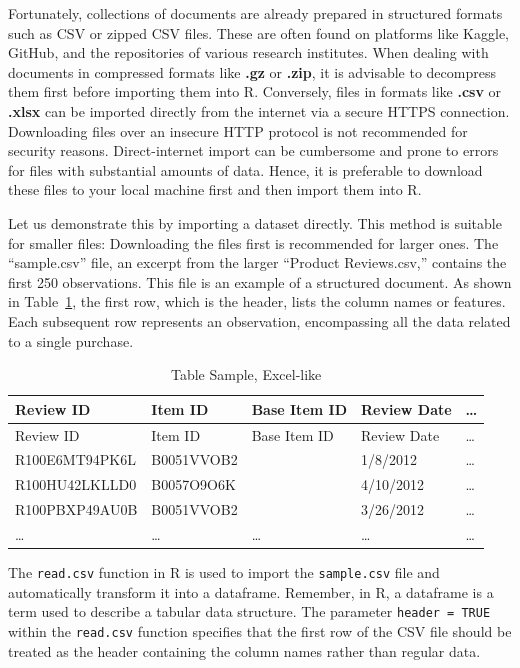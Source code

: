 Fortunately, collections of documents are already prepared in structured
formats such as CSV or zipped CSV files. These are often found on platforms
like Kaggle, GitHub, and the repositories of various research institutes. When
dealing with documents in compressed formats like \textbf{.gz} or
\textbf{.zip}, it is advisable to decompress them first before importing
them into R. Conversely, files in formats like \textbf{.csv} or
\textbf{.xlsx} can be imported directly from the internet via a secure
HTTPS connection. Downloading files over an insecure HTTP protocol is
not recommended for security reasons. Direct-internet import can be
cumbersome and prone to errors for files with substantial amounts of data. Hence,
it is preferable to download these files to your local machine first and
then import them into R.

Let us demonstrate this by  importing a dataset directly. This method is suitable for smaller files: Downloading the files first 
is recommended for larger ones. The ``sample.csv'' file, an excerpt from
the larger ``Product Reviews.csv,'' contains the first 250 observations.
This file is an example of a structured document. As shown in
Table~\ref{tbl-csvtable}, the first row, which is the header, lists the
column names or features. Each subsequent row represents an observation,
encompassing all the data related to a single purchase.

\begin{longtable}[]{@{}lllll@{}}
\caption{Table Sample, Excel-like}\label{tbl-csvtable}\tabularnewline
\toprule\noalign{}
Review ID & Item ID & Base Item ID & Review Date & \ldots{} \\
\midrule\noalign{}
\endfirsthead
\toprule\noalign{}
Review ID & Item ID & Base Item ID & Review Date & \ldots{} \\
\midrule\noalign{}
\endhead
\bottomrule\noalign{}
\endlastfoot
R100E6MT94PK6L & B0051VVOB2 & & 1/8/2012 & \ldots{} \\
R100HU42LKLLD0 & B0057O9O6K & & 4/10/2012 & \ldots{} \\
R100PBXP49AU0B & B0051VVOB2 & & 3/26/2012 & \ldots{} \\
\ldots{} & \ldots{} & \ldots{} & \ldots{} & \ldots{} \\
\end{longtable}

The \texttt{read.csv} function in R is used to import the
\texttt{sample.csv} file and automatically transform it into a
dataframe. Remember, in R, a dataframe is a term used to describe a
tabular data structure. The parameter \texttt{header\ =\ TRUE} within
the \texttt{read.csv} function specifies that the first row of the CSV
file should be treated as the header containing the column names rather
than regular data.

